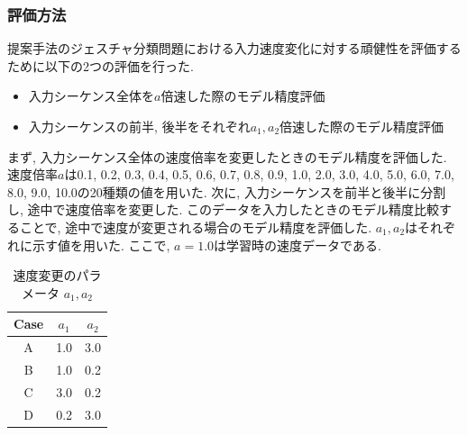 \subsubsection{評価方法}
提案手法のジェスチャ分類問題における入力速度変化に対する頑健性を評価するために以下の2つの評価を行った.
\begin{itemize}
    \item 入力シーケンス全体を$a$倍速した際のモデル精度評価
    \item 入力シーケンスの前半, 後半をそれぞれ$a_1, a_2$倍速した際のモデル精度評価
\end{itemize}
まず, 入力シーケンス全体の速度倍率を変更したときのモデル精度を評価した.
速度倍率$a$は0.1, 0.2, 0.3, 0.4, 0.5, 0.6, 0.7, 0.8, 0.9, 1.0, 2.0, 3.0, 4.0, 5.0, 6.0, 7.0, 8.0, 9.0, 10.0の20種類の値を用いた.
次に, 入力シーケンスを前半と後半に分割し, 途中で速度倍率を変更した.
このデータを入力したときのモデル精度比較することで, 途中で速度が変更される場合のモデル精度を評価した.
$a_1, a_2$はそれぞれに示す値を用いた.
ここで, $a=1.0$は学習時の速度データである.

\begin{table}[htb]
    \centering
    \caption{速度変更のパラメータ $a_1, a_2$}
    \label{tab:model:parameter:speed:change}
    \begin{tabular}{ccc}
        \hline
        \textbf{Case}& $a_1$ & $a_2$\\
        \hline
        A&1.0&3.0\\
        B&1.0&0.2\\
        C&3.0&0.2\\
        D&0.2&3.0\\
        \hline
    \end{tabular}
\end{table}
